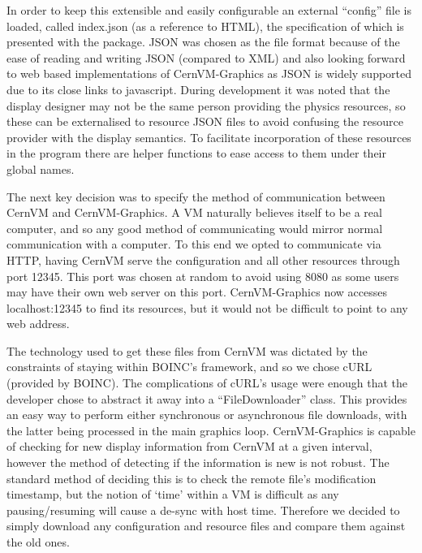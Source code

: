 \documentclass[twocolumn,aps]{revtex4}
\newcommand{\cernvm}{CernVM}
\newcommand{\cernvmgraphics}{\cernvm{}-Graphics}
\newcommand{\boinc}{BOINC}
\newcommand{\curl}{cURL}
\newcommand{\json}{JSON}
\newcommand{\vmport}{12345}
\begin{document}
    In order to keep this extensible and easily configurable an external
    ``config'' file is loaded, called index.json (as a reference to HTML),
    the specification of which is presented with the package.  \json{} was 
    chosen as the file format because of the ease of reading and writing 
    \json{} (compared to XML) and also looking forward to web based 
    implementations of \cernvmgraphics{} as \json{} is widely supported due 
    to its close links to javascript. During development it was noted that
    the display designer may not be the same person providing the physics
    resources, so these can be externalised to resource \json{} files to
    avoid confusing the resource provider with the display semantics.
    To facilitate incorporation of these resources in the program there are 
    helper functions to ease access to them under their global names.

    The next key decision was to specify the method of communication
    between \cernvm{} and \cernvmgraphics{}. A VM naturally believes itself
    to be a real computer, and so any good method of communicating would 
    mirror normal communication with a computer. To this end we opted to
    communicate via HTTP, having \cernvm{} serve the configuration and all
    other resources through port \vmport{}. This port was chosen at random
    to avoid using 8080 as some users may have their own web server on this
    port. \cernvmgraphics{} now accesses localhost:\vmport{} to find its
    resources, but it would not be difficult to point to any web address.

    The technology used to get these files from \cernvm{} was dictated by
    the constraints of staying within \boinc{}'s framework, and so we chose
    \curl{} (provided by \boinc{}). The complications of \curl{}'s usage
    were enough that the developer chose to abstract it away into a
    ``FileDownloader'' class. This provides an easy way to perform either
    synchronous or asynchronous file downloads, with the latter being
    processed in the main graphics loop. \cernvmgraphics{} is capable of 
    checking for new display information from \cernvm{} at a given interval,
    however the method of detecting if the information is new is not robust.
    The standard method of deciding this is to check the remote file's
    modification timestamp, but the notion of `time' within a VM is 
    difficult as any pausing/resuming will cause a de-sync with host time. 
    Therefore we decided to simply download any configuration and resource
    files and compare them against the old ones.
\end{document}
